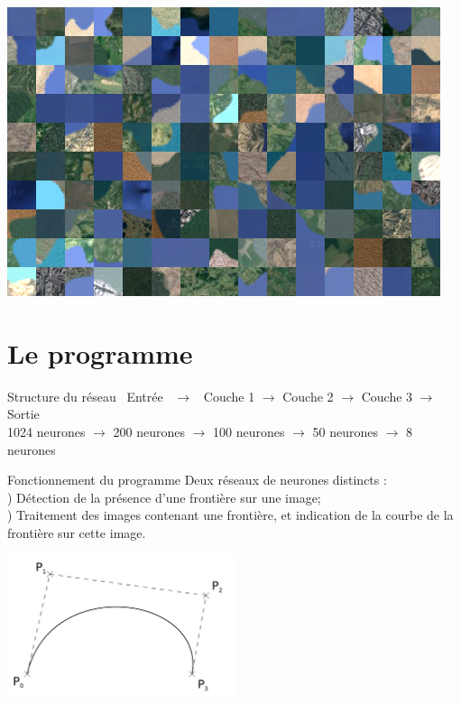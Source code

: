 \documentclass[ignorenonframetext,]{beamer}
\begin{document}
\begin{frame}{}
	\includegraphics{tableau.png}
\end{frame}

\section{Le programme}
\begin{frame}{Structure du réseau}
	\ Entrée \ $\longrightarrow$ \ Couche 1 $\longrightarrow$ Couche 2 $\longrightarrow$ Couche 3 $\longrightarrow$ Sortie \\
	\scriptsize{1024 neurones $\longrightarrow$ 200 neurones $\longrightarrow$ 100 neurones $\longrightarrow$ 50 neurones $\longrightarrow$ 8 neurones}
\end{frame}

\begin{frame}{Fonctionnement du programme}
	Deux réseaux de neurones distincts :\\
	) Détection de la présence d'une frontière sur une image;\\
	) Traitement des images contenant une frontière, et indication de la courbe de la frontière sur cette image.\\
	\begin{center}
		\includegraphics[width=0.5\textwidth]{bezier.png}
	\end{center}
\end{frame}
\end{document}

